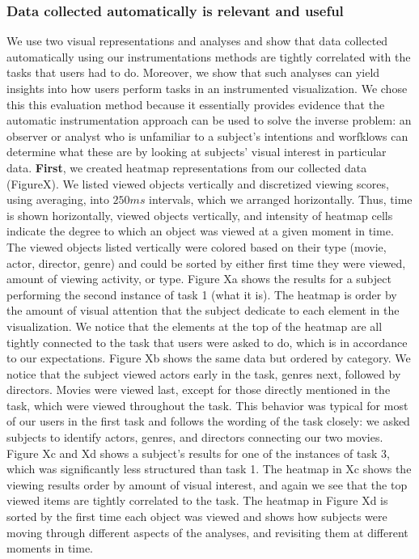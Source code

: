 \subsubsection{Data collected automatically is relevant and useful}
\label{sec:EvalDataCollected}
We use two visual representations and analyses and show that data collected automatically using our instrumentations methods are tightly correlated with the tasks that users had to do. Moreover, we show that such analyses can yield insights into how users perform tasks in an instrumented visualization. We chose this this evaluation method because it essentially provides evidence that the automatic instrumentation approach can be used to solve the inverse problem: an observer or analyst who is unfamiliar to a subject's intentions and worfklows can determine what these are by looking at subjects' visual interest in particular data. 
\textbf{First}, we created heatmap representations from our collected data (FigureX). We listed viewed objects vertically and discretized viewing scores, using averaging, into $250ms$ intervals, which we arranged horizontally. Thus, time is shown horizontally, viewed objects vertically, and intensity of heatmap cells indicate the degree to which an object was viewed at a given moment in time. The viewed objects listed vertically were colored based on their type (movie, actor, director, genre) and could be sorted by either first time they were viewed, amount of viewing activity, or type. 
Figure Xa shows the results for a subject performing the second instance of task 1 (what it is). The heatmap is order by the amount of visual attention that the subject dedicate to each element in the visualization. We notice that the elements at the top of the heatmap are all tightly connected to the task that users were asked to do, which is in accordance to our expectations. Figure Xb shows the same data but ordered by category. We notice that the subject viewed actors early in the task, genres next, followed by directors. Movies were viewed last, except for those directly mentioned in the task, which were viewed throughout the task. This behavior was typical for most of our users in the first task and follows the wording of the task closely: we asked subjects to identify actors, genres, and directors connecting our two movies. 
Figure Xc and Xd shows a subject’s results for one of the instances of task 3, which was significantly less structured than task 1. The heatmap in Xc shows the viewing results order by amount of visual interest, and again we see that the top viewed items are tightly correlated to the task. The heatmap in Figure Xd is sorted by the first time each object was viewed and shows how subjects were moving through different aspects of the analyses, and revisiting them at different moments in time. 
